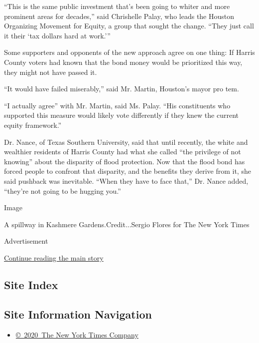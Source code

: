 ``This is the same public investment that's been going to whiter and
more prominent areas for decades,'' said Chrishelle Palay, who leads the
Houston Organizing Movement for Equity, a group that sought the change.
``They just call it their `tax dollars hard at work.'''

Some supporters and opponents of the new approach agree on one thing: If
Harris County voters had known that the bond money would be prioritized
this way, they might not have passed it.

``It would have failed miserably,'' said Mr. Martin, Houston's mayor pro
tem.

``I actually agree'' with Mr. Martin, said Ms. Palay. ``His constituents
who supported this measure would likely vote differently if they knew
the current equity framework.''

Dr. Nance, of Texas Southern University, said that until recently, the
white and wealthier residents of Harris County had what she called ``the
privilege of not knowing'' about the disparity of flood protection. Now
that the flood bond has forced people to confront that disparity, and
the benefits they derive from it, she said pushback was inevitable.
``When they have to face that,'' Dr. Nance added, ``they're not going to
be hugging you.''

Image

A spillway in Kashmere Gardens.Credit...Sergio Flores for The New York
Times

Advertisement

\protect\hyperlink{after-bottom}{Continue reading the main story}

\hypertarget{site-index}{%
\subsection{Site Index}\label{site-index}}

\hypertarget{site-information-navigation}{%
\subsection{Site Information
Navigation}\label{site-information-navigation}}

\begin{itemize}
\tightlist
\item
  \href{https://help.nytimes3xbfgragh.onion/hc/en-us/articles/115014792127-Copyright-notice}{©~2020~The
  New York Times Company}
\end{itemize}

